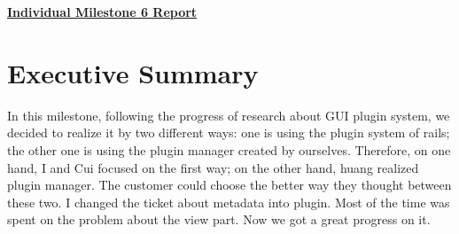 \documentclass{article}
\begin{document}
\pagestyle{headings}

\begin{center}
{\LARGE\textbf{\underline{{Individual Milestone 6 Report}}}}
\end{center}

\section*{Executive Summary}

In this milestone, following the progress of research about GUI plugin system, we decided to realize it by two different ways: one is using the plugin system of rails; the other one is using the plugin manager created by ourselves. Therefore, on one hand, I and Cui focused on the first way; on the other hand, huang realized plugin manager. The customer could choose the better way they thought between these two. I changed the ticket about metadata into plugin. Most of the time was spent on the problem about the view part. Now we got a great progress on it. 
\end{document}
